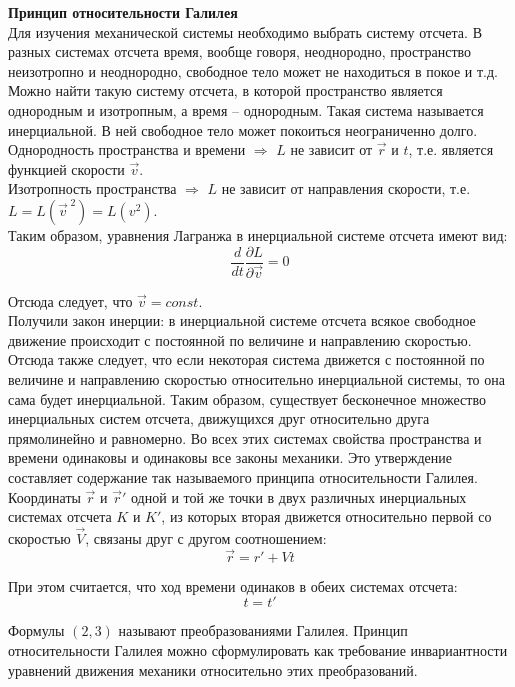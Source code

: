 \documentclass{article}
\begin{document}
	
	\textbf{Принцип относительности Галилея}\\

	Для изучения механической системы необходимо выбрать систему отсчета. В разных системах отсчета время, вообще говоря, неоднородно, пространство неизотропно и неоднородно, свободное тело может не находиться в покое и т.д.\\

	Можно найти такую систему отсчета, в которой пространство является однородным и изотропным, а время -- однородным. Такая система называется инерциальной. В ней свободное тело может покоиться неограниченно долго.\\

	Однородность пространства и времени $\Rightarrow$ $L$ не зависит от $\vec r$ и $t$, т.е. является функцией скорости $\vec v$.\\

	Изотропность пространства $\Rightarrow$ $L$ не зависит от направления скорости, т.е. $L=L(\vec v^{\;2})=L(v^2)$.\\

	Таким образом, уравнения Лагранжа в инерциальной системе отсчета имеют вид:
	\begin{equation}
		\frac{d}{dt}\frac{\partial L}{\partial\vec v} = 0
	\end{equation}

	Отсюда следует, что $\vec v=const$.\\

	Получили закон инерции: в инерциальной системе отсчета всякое свободное движение происходит с постоянной по величине и направлению скоростью. Отсюда также следует, что если некоторая система движется с постоянной по величине и направлению скоростью относительно инерциальной системы, то она сама будет инерциальной. Таким образом, существует бесконечное множество инерциальных систем отсчета, движущихся друг относительно друга прямолинейно и равномерно. Во всех этих системах свойства пространства и времени одинаковы и одинаковы все законы механики. Это утверждение составляет содержание так называемого принципа относительности Галилея.\\

	Координаты $\vec r$ и $\vec r'$ одной и той же точки в двух различных инерциальных системах отсчета $K$ и $K'$, из которых вторая движется относительно первой со скоростью $\vec V$, связаны друг с другом соотношением:
	\begin{equation}
		\vec r = r' + Vt
	\end{equation}

	При этом считается, что ход времени одинаков в обеих системах отсчета:
	\begin{equation}
		t = t'
	\end{equation}

	Формулы $(2,3)$ называют преобразованиями Галилея. Принцип относительности Галилея можно сформулировать как требование инвариантности уравнений движения механики относительно этих преобразований.
\end{document}

